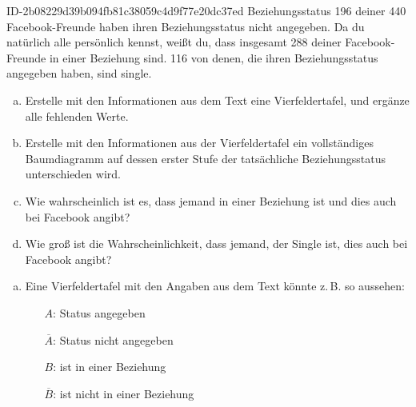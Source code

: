 \begin{exercise}
      {ID-2b08229d39b094fb81c38059c4d9f77e20dc37ed}
      {Beziehungsstatus}
  \ifproblem\problem
    \num{196} deiner \num{440} Facebook-Freunde haben ihren Beziehungsstatus nicht angegeben.
    Da du natürlich alle persönlich kennst, weißt du, dass insgesamt \num{288} deiner
    Face\-book-Freunde in einer Beziehung sind. \num{116} von denen, die ihren
    Beziehungsstatus angegeben haben, sind single.
    \begin{enumerate}[a)]
      \item Erstelle mit den Informationen aus dem Text eine Vierfeldertafel,
            und ergänze alle fehlenden Werte.
      \item Erstelle mit den Informationen aus der Vierfeldertafel ein
            vollständiges Baumdiagramm auf dessen erster Stufe der
            tatsächliche Beziehungsstatus unterschieden wird.
      \item Wie wahrscheinlich ist es, dass jemand in einer Beziehung
            ist und dies auch bei Facebook angibt?
      \item Wie groß ist die Wahrscheinlichkeit, dass jemand, der Single ist,
            dies auch bei Facebook angibt?
    \end{enumerate}
  \fi
  \ifoutline\outline
    \begin{enumerate}[a)]
      \item Eine Vierfeldertafel mit den Angaben aus dem Text
            könnte z.\,B. so aussehen:
            \begin{center}
              \begin{minipage}{0.36\linewidth}
                \begin{itemize}
                  \setlength{\leftskip}{0pt}%
                  \setlength{\itemsep}{-0.1\baselineskip}%
                  \item[$A$:]            Status angegeben
                  \item[$\overline{A}$:] Status nicht angegeben
                  \item[$B$:]            ist in einer Beziehung
                  \item[$\overline{B}$:] ist nicht in einer Beziehung
                \end{itemize}
              \end{minipage}
              \qquad
              \begin{fourfoldtable}

\end{fourfoldtable}
\end{center}
\end{enumerate}
\end{exercise}
